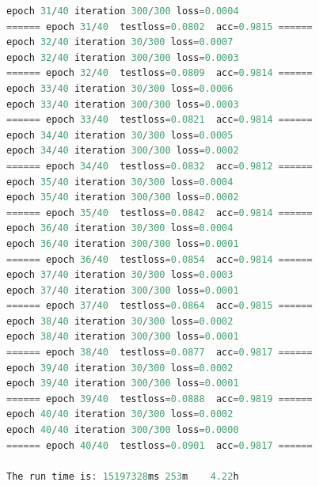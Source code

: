 \documentclass[UTF-8]{progbookcn}
\begin{document}
\begin{lstlisting}[language=C,caption={输出代码}]
epoch 31/40 iteration 300/300 loss=0.0004
====== epoch 31/40  testloss=0.0802  acc=0.9815 ======
epoch 32/40 iteration 30/300 loss=0.0007
epoch 32/40 iteration 300/300 loss=0.0003
====== epoch 32/40  testloss=0.0809  acc=0.9814 ======
epoch 33/40 iteration 30/300 loss=0.0006
epoch 33/40 iteration 300/300 loss=0.0003
====== epoch 33/40  testloss=0.0821  acc=0.9814 ======
epoch 34/40 iteration 30/300 loss=0.0005
epoch 34/40 iteration 300/300 loss=0.0002
====== epoch 34/40  testloss=0.0832  acc=0.9812 ======
epoch 35/40 iteration 30/300 loss=0.0004
epoch 35/40 iteration 300/300 loss=0.0002
====== epoch 35/40  testloss=0.0842  acc=0.9814 ======
epoch 36/40 iteration 30/300 loss=0.0004
epoch 36/40 iteration 300/300 loss=0.0001
====== epoch 36/40  testloss=0.0854  acc=0.9814 ======
epoch 37/40 iteration 30/300 loss=0.0003
epoch 37/40 iteration 300/300 loss=0.0001
====== epoch 37/40  testloss=0.0864  acc=0.9815 ======
epoch 38/40 iteration 30/300 loss=0.0002
epoch 38/40 iteration 300/300 loss=0.0001
====== epoch 38/40  testloss=0.0877  acc=0.9817 ======
epoch 39/40 iteration 30/300 loss=0.0002
epoch 39/40 iteration 300/300 loss=0.0001
====== epoch 39/40  testloss=0.0888  acc=0.9819 ======
epoch 40/40 iteration 30/300 loss=0.0002
epoch 40/40 iteration 300/300 loss=0.0000
====== epoch 40/40  testloss=0.0901  acc=0.9817 ======

The run time is: 15197328ms	253m 	4.22h
\end{lstlisting}




%
\end{document}
